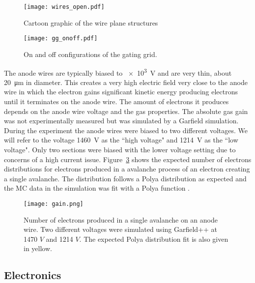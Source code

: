 \begin{figure}
\texttt{[image: wires\_open.pdf]}
\caption{Cartoon graphic of the wire plane structures}
\label{fig:wires_open}
\end{figure}


\begin{figure}[!htb]
\texttt{[image: gg\_onoff.pdf]}
\caption{On and off configurations of the gating grid.}
\label{fig:gg_onoff}
\end{figure}

The anode wires are typically biased to \SI{e3}{\volt} and are very thin, about \SI{20}{\micro\metre} in diameter. This creates a very high electric field very close to the anode wire in which the electron gains significant kinetic energy producing electrons until it terminates on the anode wire. The amount of electrons it produces depends on the anode wire voltage and the gas properties. The absolute gas gain was not experimentally measured but was simulated by a Garfield simulation. During the experiment the anode wires were biased to two different voltages. We will refer to the voltage \SI{1460}{\volt} as the ``high voltage" and \SI{1214}{\volt} as the ``low voltage". Only two sections were biased with the lower voltage setting due to concerns of a high current issue. Figure~\ref{fig:anodegain} shows the expected number of electrons distributions for electrons produced in a avalanche process of an electron creating a single avalanche. The distribution follows a Polya distribution as expected and the MC data in the simulation was fit with a Polya function \cite{blumrol}. 

 
\begin{figure}[!htb]
\texttt{[image: gain.png]}
\caption{Number of electrons produced in a single avalanche on an anode wire. Two different voltages were simulated using Garfield++ at 1470 $V$ and 1214 $V$. The expected Polya distribution fit is also given in yellow.}
\label{fig:anodegain}
\end{figure}


\subsection{Electronics}

